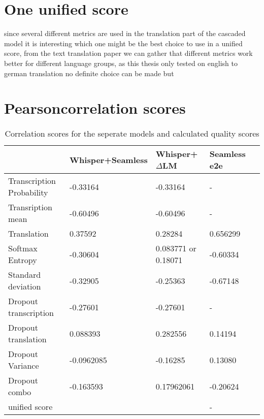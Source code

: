 \section{One unified score}
since several different metrics are used in the translation part of the cascaded model it is interesting which one might be the best choice to use in a unified score, from the text translation paper \cite{fomicheva2020unsupervised} we can gather that different metrics work better for different language groups, as this thesis only tested on english to german translation no definite choice can be made but



\section{Pearsoncorrelation scores}
\begin{table}[ht]
\begin{tabular}{l|llll}
    &  Whisper+Seamless & Whisper+$\Delta$LM&  Seamless e2e\\ \hline
 Transcription Probability& -0.33164 & -0.33164&  -  \\
 Transription mean & -0.60496 & -0.60496  &   - \\ \hline
Translation & 0.37592 & 0.28284 & 0.656299\\ 
Softmax Entropy & -0.30604   & 0.083771 or  0.18071 & -0.60334 \\
Standard deviation & -0.32905  & -0.25363& -0.67148 \\ \hline

Dropout transcription & -0.27601 & -0.27601& -\\
Dropout translation &  0.088393  & 0.282556& 0.14194\\

Dropout Variance &-0.0962085 & -0.16285& 0.13080\\
Dropout combo & -0.163593& 0.17962061& -0.20624\\
\hline
unified score   &  &  & - 

\end{tabular}
\label{results}
\caption{Correlation scores for the seperate models and calculated quality scores}
\end{table}

